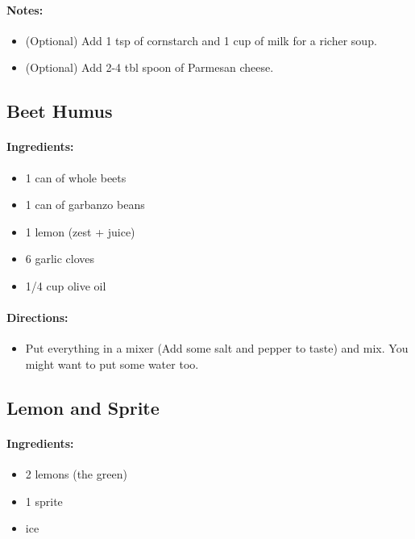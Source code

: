 \documentclass{article}
\begin{document}
\paragraph{Notes:}
\begin{itemize}
	\item (Optional) Add 1 tsp of cornstarch and 1 cup of milk for a richer soup.
	\item (Optional) Add 2-4 tbl spoon of Parmesan cheese.
\end{itemize}

\subsection{Beet Humus}

\paragraph{Ingredients:}

\begin{itemize}
	\item 1 can of whole beets
	\item 1 can of garbanzo beans
	\item 1 lemon (zest + juice)
	\item 6 garlic cloves
	\item 1/4 cup olive oil
\end{itemize}

\paragraph{Directions:}

\begin{itemize}
	\item Put everything in a mixer (Add some salt and pepper to taste) and mix. You might want to put some water too.
\end{itemize}

\subsection{Lemon and Sprite}

\paragraph{Ingredients:}

\begin{itemize}
	\item 2 lemons (the green)
	\item 1 sprite
	\item ice
\end{itemize}
\end{document}
